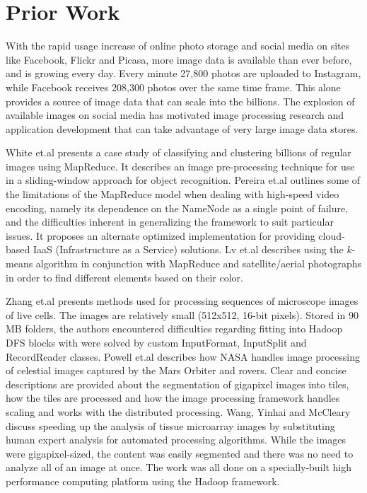 \documentclass{osuthesis}
\begin{document}
				\section{Prior Work}
				With the rapid usage increase of online photo storage and social media
				on sites like Facebook, Flickr and Picasa, more image data is
				available than ever before, and is growing every day.  Every minute
				27,800 photos are uploaded to Instagram,\cite{Horaczek2013} while
				Facebook receives 208,300 photos over the same time frame. This alone
				provides a source of image data that can scale into the billions.  The
				explosion of available images on social media has motivated image
				processing research and application development that can take
				advantage of very large image data stores.
				
				White et.al \cite{White2010} presents a case study of classifying and
				clustering billions of regular images using MapReduce.  It describes
				an image pre-processing technique for use in a sliding-window approach
				for object recognition.  Pereira et.al \cite{Pereira2010} outlines
				some of the limitations of the MapReduce model when dealing with
				high-speed video encoding, namely its dependence on the NameNode as a
				single point of failure, and the difficulties inherent in generalizing
				the framework to suit particular issues.  It proposes an alternate
				optimized implementation for providing cloud-based IaaS
				(Infrastructure as a Service) solutions.  Lv et.al \cite{Lv2010}
				describes using the $k$-means algorithm in conjunction with MapReduce
				and satellite/aerial photographs in order to find different elements
				based on their color.
				
				Zhang et.al \cite{Zhang2010} presents methods used for processing
				sequences of microscope images of live cells. The images are
				relatively small (512x512, 16-bit pixels).  Stored in 90 MB folders,
				the authors encountered difficulties regarding fitting into Hadoop DFS
				blocks with were solved by custom InputFormat, InputSplit and
				RecordReader classes.  Powell et.al \cite{Powell2010} describes how
				NASA handles image processing of celestial images captured by the Mars
				Orbiter and rovers. Clear and concise descriptions are provided about
				the segmentation of gigapixel images into tiles, how the tiles are
				processed and how the image processing framework handles scaling and
				works with the distributed processing. Wang, Yinhai and
				McCleary\cite{Wang2011} discuss speeding up the analysis of tissue
				microarray images by substituting human expert analysis for automated
				processing algorithms. While the images were gigapixel-sized, the
				content was easily segmented and there was no need to analyze all of
				an image at once. The work was all done on a specially-built high
				performance computing platform using the Hadoop framework.
				
\end{document}
